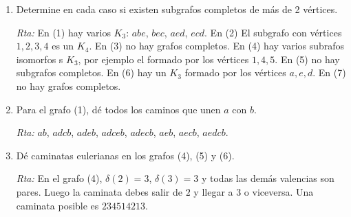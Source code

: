 \documentclass[12pt,spanish,makeidx]{amsbook}
\theoremstyle{definition}
\theoremstyle{remark}
\newcommand{\rta}{\noindent\textit{Rta: }}
\begin{document}
\begin{enumerate}




\begin{enumerate}
	\item Determine en cada caso si existen subgrafos completos de más de 2 vértices.
	
	\rta En (1) hay varios $K_3$: $abe$, $bec$, $aed$, $ecd$. En (2) El subgrafo con vértices $1,2,3,4$  es un $K_4$. En (3) no hay grafos completos. En (4) hay varios subrafos isomorfos s $K_3$, por ejemplo el formado por los vértices $1,4,5$. En (5) no hay subgrafos completos. En (6) hay un $K_3$ formado por los vértices $a,e,d$. En (7) no hay grafos completos. 
	
	\item Para el grafo (1), dé todos los caminos que unen $a$ con $b$.
	
	\rta $ab$, $adcb$, $adeb$, $adceb$, $adecb$, $aeb$, $aecb$, $aedcb$.  
	
	
	\item Dé caminatas eulerianas en los grafos (4), (5) y (6).
	
	\rta  En  el  grafo (4), $\delta(2)=3$, $\delta(3)=3$ y todas las demás valencias son pares. Luego la caminata debes salir de $2$ y llegar a $3$ o viceversa. Una caminata posible es $234514213$.    
	

\end{enumerate}
\end{enumerate}
\end{document}

